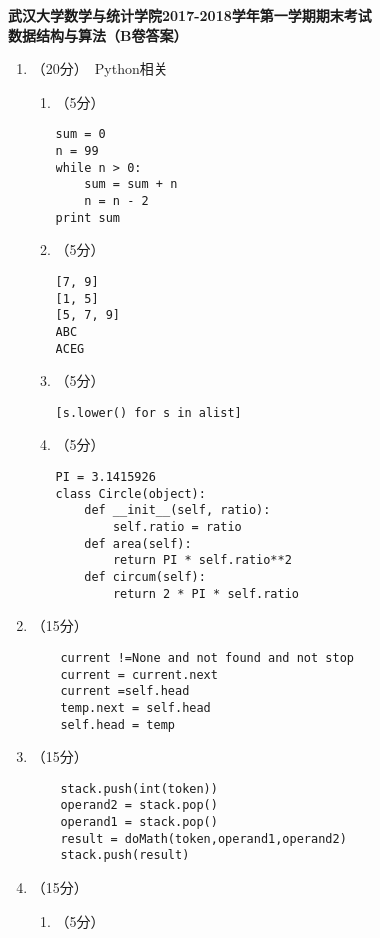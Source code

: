 \documentclass[8pt]{article}
\newlength{\la}
\begin{document}
\begin{CJK}{UTF8}{gkai}
\begin{center}
{\Large \bf  武汉大学数学与统计学院2017-2018学年第一学期期末考试\\[0.1in]
  数据结构与算法（B卷答案）} \vspace{0.1in}

\end{center}


\begin{enumerate} %
\item （20分）~Python相关
  \begin{enumerate}
  \item （5分）
    \begin{lstlisting}
sum = 0
n = 99
while n > 0:
    sum = sum + n
    n = n - 2
print sum      
    \end{lstlisting}
  \item （5分）
    \begin{lstlisting}
[7, 9]
[1, 5]
[5, 7, 9]
ABC
ACEG
    \end{lstlisting}
  \item （5分）
\begin{lstlisting}
[s.lower() for s in alist]
  \end{lstlisting}
\item （5分）
  \begin{lstlisting}
PI = 3.1415926    
class Circle(object):
    def __init__(self, ratio):
        self.ratio = ratio
    def area(self):
        return PI * self.ratio**2
    def circum(self):
        return 2 * PI * self.ratio
  \end{lstlisting}    
  \end{enumerate}
\item （15分）~
  \begin{lstlisting}
    current !=None and not found and not stop
    current = current.next
    current =self.head
    temp.next = self.head
    self.head = temp
  \end{lstlisting}
\item （15分）~
  \begin{lstlisting}
    stack.push(int(token))
    operand2 = stack.pop()
    operand1 = stack.pop()
    result = doMath(token,operand1,operand2)
    stack.push(result)
  \end{lstlisting}
\item （15分）~
  \begin{enumerate}
  \item （5分）~
    \begin{lstlisting}

\end{lstlisting}
\end{enumerate}
\end{enumerate}
\end{CJK}
\end{document}
